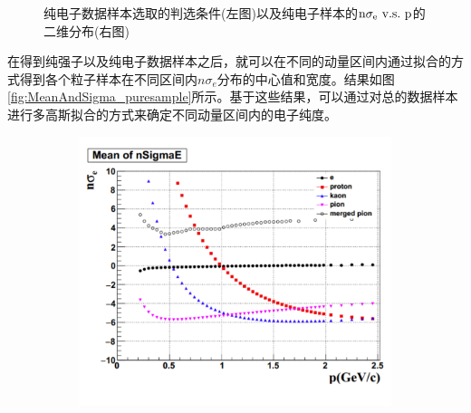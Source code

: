 \begin{figure}[h!]
\begin{subfigure}[h!]{0.45\textwidth}
            \caption{}
            \label{fig:PureElectron_Sample}
    \end{subfigure}
    \caption[纯电子数据样本选取的判选条件以及纯电子样本的$\rm{n\sigma_{e}~v.s.~p}$的二维分布]{纯电子数据样本选取的判选条件(左图)以及纯电子样本的$\rm{n\sigma_{e}~v.s.~p}$的二维分布(右图)}
    \label{fig:PureElectron_sample_total}
\end{figure}

在得到纯强子以及纯电子数据样本之后，就可以在不同的动量区间内通过拟合的方式得到各个粒子样本在不同区间内$n\sigma_{e}$分布的中心值和宽度。结果如图\ref{fig:MeanAndSigma_puresample}所示。基于这些结果，可以通过对总的数据样本进行多高斯拟合的方式来确定不同动量区间内的电子纯度。

\begin{figure}[h!]
    \centering
    \begin{subfigure}[h!]{0.45\textwidth}
            \includegraphics[width=\textwidth]{figures/Chapter4/Mean_pureSample.png}
            \caption{}
            \label{fig:Mean_pureSample}
    \end{subfigure}
    \begin{subfigure}[h!]{0.45\textwidth}

\end{subfigure}
\end{figure}
